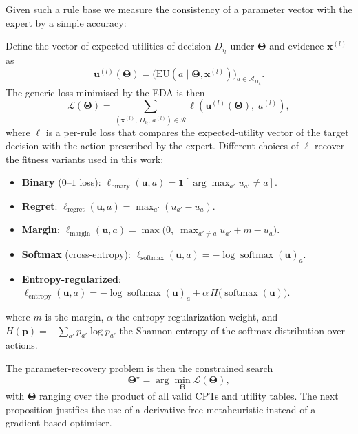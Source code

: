 Given such a rule base we measure the consistency of a parameter
vector with the expert by a simple accuracy:

\begin{definition}
\label{def:fitness}
Define the vector of expected utilities of decision $D_{i_l}$ under
$\boldsymbol{\Theta}$ and evidence $\mathbf{x}^{(l)}$ as
\[
   \mathbf{u}^{(l)}(\boldsymbol{\Theta}) =
   \bigl(\mathrm{EU}(a \mid \boldsymbol{\Theta}, \mathbf{x}^{(l)})\bigr)_{a\in\mathcal{A}_{D_{i_l}}}.
\]
The generic loss minimised by the EDA is then
\[
   \mathcal{L}(\boldsymbol{\Theta}) =
   \sum_{(\mathbf{x}^{(l)},\,D_{i_l},\,a^{(l)})\in\mathcal{R}}
   \ell\!\left(\mathbf{u}^{(l)}(\boldsymbol{\Theta}),\; a^{(l)}\right),
\]
where $\ell$ is a per-rule loss that compares the expected-utility
vector of the target decision with the action prescribed by the
expert. Different choices of $\ell$ recover the fitness variants used
in this work:
\begin{itemize}
   \item \textbf{Binary} ($0$--$1$ loss):
         $\ell_{\mathrm{binary}}(\mathbf{u}, a) = \mathbf{1}\!\left[\textstyle\arg\max_{a'} u_{a'} \neq a\right]$.
   \item \textbf{Regret}:
         $\ell_{\mathrm{regret}}(\mathbf{u}, a) = \max_{a'} \left( u_{a'} - u_a \right)$.
   \item \textbf{Margin}:
         $\ell_{\mathrm{margin}}(\mathbf{u}, a) = \max\!\bigl(0,\; \max_{a'\neq a} u_{a'} + m - u_a\bigr)$.
   \item \textbf{Softmax} (cross-entropy):
         $\ell_{\mathrm{softmax}}(\mathbf{u}, a) = -\log \operatorname{softmax}(\mathbf{u})_a$.
   \item \textbf{Entropy-regularized}:
         $\ell_{\mathrm{entropy}}(\mathbf{u}, a) = -\log \operatorname{softmax}(\mathbf{u})_a + \alpha\, H\!\bigl(\operatorname{softmax}(\mathbf{u})\bigr)$.
\end{itemize}
where $m$ is the margin, $\alpha$ the entropy-regularization weight, and
$H(\mathbf{p}) = -\sum_{a'} p_{a'}\log p_{a'}$ the Shannon entropy of the
softmax distribution over actions.

\end{definition}

The parameter-recovery problem is then the constrained search
\[
   \boldsymbol{\Theta}^{\star} =
   \arg\min_{\boldsymbol{\Theta}} \mathcal{L}(\boldsymbol{\Theta}),
\]
with $\boldsymbol{\Theta}$ ranging over the product of all valid
CPTs and utility tables. The next proposition justifies the use of
a derivative-free metaheuristic instead of a gradient-based
optimiser.

